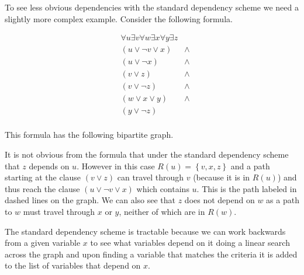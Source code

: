 \begin{center}

\end{center}

To see less obvious dependencies with the standard dependency scheme we need a slightly more complex example. Consider the following formula.

\begin{equation}
\begin{aligned}
&\forall u \exists v \forall w \exists x \forall y \exists z\\
&(u \lor \neg v \lor x) &\land\\
&(u \lor \neg x) &\land\\
&(v \lor z) &\land\\
&(v \lor \neg z) &\land\\
&(w \lor x \lor y) &\land\\
&(y \lor \neg z)\\
\end{aligned}
\end{equation}

This formula has the following bipartite graph.

\begin{center}

\end{center}

It is not obvious from the formula that under the standard dependency scheme that $z$ depends on $u$. However in this case $R(u)=\left \{v, x, z\right \}$ and a path starting at the clause $(v \lor z)$ can travel through $v$ (because it is in $R(u)$) and thus reach the clause $(u \lor \neg v \lor x)$ which contains $u$. This is the path labeled in dashed lines on the graph. We can also see that $z$ does not depend on $w$ as a path to $w$ must travel through $x$ or $y$, neither of which are in $R(w)$.

The standard dependency scheme is tractable \cite{backdoorsets} because we can work backwards from a given variable $x$ to see what variables depend on it doing a linear search across the graph and upon finding a variable that matches the criteria it is added to the list of variables that depend on $x$. 
